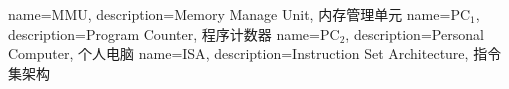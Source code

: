  {
    name={MMU},
    description={Memory Manage Unit, 内存管理单元}
}
 {
    name={PC${}_{1}$},
    description={Program Counter, 程序计数器}
}
 {
    name={PC${}_{2}$},
    description={Personal Computer, 个人电脑}
}
 {
	name={ISA}, 
	description={Instruction Set Architecture, 指令集架构}
}

